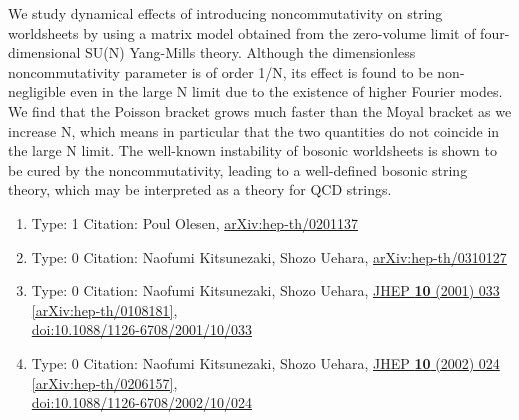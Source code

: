 \documentclass[a4paper,10pt]{article}
\begin{document}
\begin{enumerate}
We study dynamical effects of introducing noncommutativity on string worldsheets by using a matrix model obtained from the zero-volume limit of four-dimensional SU(N) Yang-Mills theory. Although the dimensionless noncommutativity parameter is of order 1/N, its effect is found to be non-negligible even in the large N limit due to the existence of higher Fourier modes. We find that the Poisson bracket grows much faster than the Moyal bracket as we increase N, which means in particular that the two quantities do not coincide in the large N limit. The well-known instability of bosonic worldsheets is shown to be cured by the noncommutativity, leading to a well-defined bosonic string theory, which may be interpreted as a theory for QCD strings.
\begin{enumerate}
  \item Type: 1 Citation: Poul Olesen, \href{https://arxiv.org/abs/hep-th/0201137}{arXiv:hep-th/0201137}
  \item Type: 0 Citation: Naofumi Kitsunezaki, Shozo Uehara, \href{https://arxiv.org/abs/hep-th/0310127}{arXiv:hep-th/0310127}
  \item Type: 0 Citation: Naofumi Kitsunezaki, Shozo Uehara, \href{https://www.doi.org/10.1088/1126-6708/2001/10/033}{JHEP {\bf 10} (2001) 033}  \href{https://arxiv.org/abs/hep-th/0108181}{[arXiv:hep-th/0108181]},\\\href{https://www.doi.org/10.1088/1126-6708/2001/10/033}{doi:10.1088/1126-6708/2001/10/033}
  \item Type: 0 Citation: Naofumi Kitsunezaki, Shozo Uehara, \href{https://www.doi.org/10.1088/1126-6708/2002/10/024}{JHEP {\bf 10} (2002) 024}  \href{https://arxiv.org/abs/hep-th/0206157}{[arXiv:hep-th/0206157]},\\\href{https://www.doi.org/10.1088/1126-6708/2002/10/024}{doi:10.1088/1126-6708/2002/10/024}

\end{enumerate}
\end{enumerate}
\end{document}
